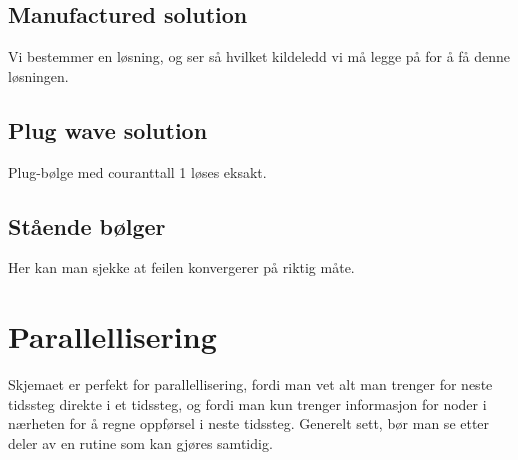 \documentclass[a4paper, 10pt]{article}
\begin{document}
\subsection{Manufactured solution}
Vi bestemmer en løsning, og ser så hvilket kildeledd vi må legge på for å få denne løsningen. 

\subsection{Plug wave solution}
Plug-bølge med couranttall 1 løses eksakt. 

\subsection{Stående bølger}
Her kan man sjekke at feilen konvergerer på riktig måte.


\section{Parallellisering}
Skjemaet er perfekt for parallellisering, fordi man vet alt man trenger for neste tidssteg direkte i et tidssteg, og fordi man kun trenger informasjon for noder i nærheten for å regne oppførsel i neste tidssteg. 
Generelt sett, bør man se etter deler av en rutine som kan gjøres samtidig. 
\end{document}
